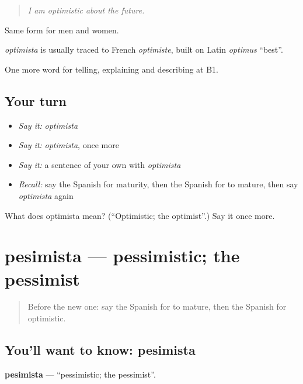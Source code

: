 \begin{quote}
\emph{I am optimistic about the future.}
\end{quote}

Same form for men and women.

\begin{cousinweb}
\emph{optimista} is usually traced to French \emph{optimiste}, built on Latin \emph{optimus} \textquotedblleft{}best\textquotedblright{}.
\end{cousinweb}

\begin{grammarlens}[title={What you've built}]
One more word for telling, explaining and describing at B1.
\end{grammarlens}

\subsection*{Your turn}
\begin{itemize}
\raggedright
  \item \emph{Say it:} \emph{optimista}
  \item \emph{Say it:} \emph{optimista}, once more
  \item \emph{Say it:} a sentence of your own with \emph{optimista}
  \item \emph{Recall:} say the Spanish for maturity, then the Spanish for to mature, then say \emph{optimista} again
\end{itemize}

\begin{tcolorbox}[breakable,colback=teal!4,colframe=teal!35!black,title={Before you move on}]
What does optimista mean? (\textquotedblleft{}Optimistic; the optimist\textquotedblright{}.) Say it once more.
\end{tcolorbox}
\section[pesimista]{pesimista — pessimistic; the pessimist}

\label{lesson:ES-C731-pesimista}



\begin{quote}
Before the new one: say the Spanish for to mature, then the Spanish for optimistic.
\end{quote}

\subsection*{You'll want to know: pesimista}
\textbf{pesimista} — \textquotedblleft{}pessimistic; the pessimist\textquotedblright{}.

